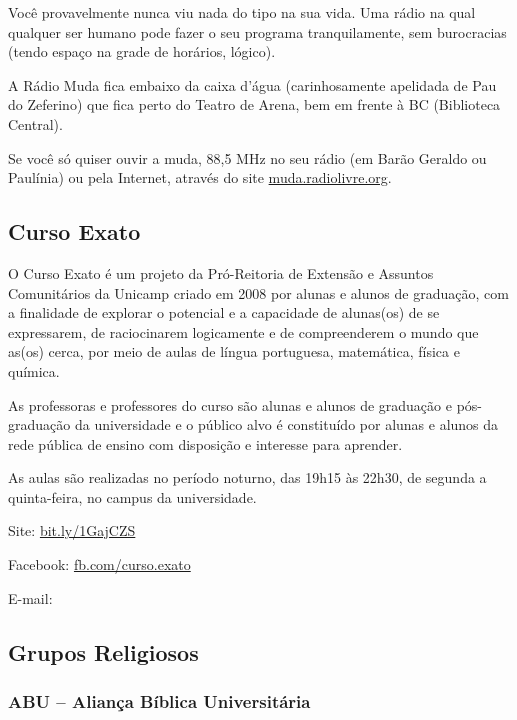 Você provavelmente nunca viu nada do tipo na sua vida. Uma rádio na qual
qualquer ser humano pode fazer o seu programa tranquilamente, sem burocracias
(tendo espaço na grade de horários, lógico).

A Rádio Muda fica embaixo da caixa d'água (carinhosamente apelidada de Pau do
Zeferino) que fica perto do Teatro de Arena, bem em frente à BC (Biblioteca
Central).

Se você só quiser ouvir a muda, 88,5 MHz no seu rádio (em Barão Geraldo ou
Paulínia) ou pela Internet, através do site \url{muda.radiolivre.org}.

\subsection{Curso Exato}

O Curso Exato é um projeto da Pró-Reitoria de Extensão e Assuntos Comunitários
da Unicamp criado em 2008 por alunas e alunos de graduação, com a finalidade de
explorar o potencial e a capacidade de alunas(os) de se expressarem, de
raciocinarem logicamente e de compreenderem o mundo que as(os) cerca, por meio
de aulas de língua portuguesa, matemática, física e química.

As professoras e professores do curso são alunas e alunos de graduação e
pós-graduação da universidade e o público alvo é constituído por alunas e
alunos da rede pública de ensino com disposição e interesse para aprender.

As aulas são realizadas no período noturno, das 19h15 às 22h30, de segunda a
quinta-feira, no campus da universidade.

\begin{compactitemize}
\item Site: \url{bit.ly/1GajCZS}
\item Facebook: \url{fb.com/curso.exato}
\item E-mail: 
\end{compactitemize}

\subsection{Grupos Religiosos}

\subsubsection{ABU -- Aliança Bíblica Universitária}

